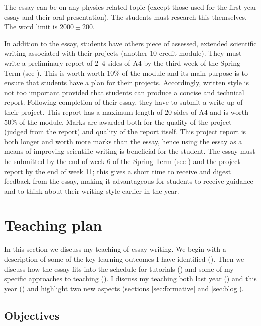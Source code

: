 The essay can be on any physics-related topic (except those used for the first-year essay and their oral presentation). The students must research this themselves. The word limit is $2000 \pm 200$. 

In addition to the essay, students have others piece of assessed, extended scientific writing associated with their projects (another $10$ credit module). They must write a preliminary report of $2$--$4$ sides of A4 by the third week of the Spring Term (see ). This is worth worth $10\%$ of the module and its main purpose is to ensure that students have a plan for their projects. Accordingly, written style is not too important provided that students can produce a concise and technical report. Following completion of their essay, they have to submit a write-up of their project. This report has a maximum length of $20$ sides of A4 and is worth $50\%$ of the module. Marks are awarded both for the quality of the project (judged from the report) and quality of the report itself. This project report is both longer and worth more marks than the essay, hence using the essay as a means of improving scientific writing is beneficial for the student. The essay must be submitted by the end of week 6 of the Spring Term (see ) and the project report by the end of week 11; this gives a short time to receive and digest feedback from the essay, making it advantageous for students to receive guidance and to think about their writing style earlier in the year.


\section{Teaching plan}\label{sec:essay-teach}

In this section we discuss my teaching of essay writing. We begin with a description of some of the key learning outcomes I have identified (). Then we discuss how the essay fits into the schedule for tutorials () and some of my specific approaches to teaching (). I discuss my teaching both last year () and this year () and highlight two new aspects (sections \ref{sec:formative} and \ref{sec:blog}).

\subsection{Objectives}\label{sec:essay-aims}

